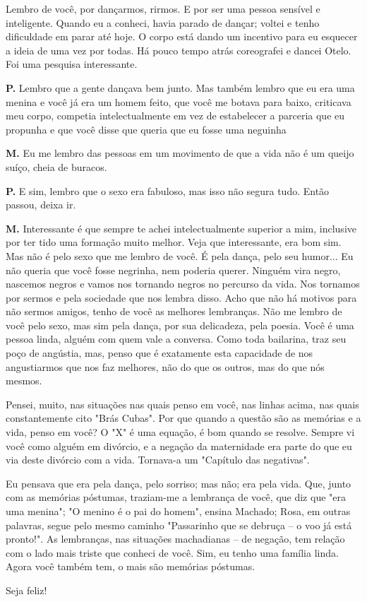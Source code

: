 {Lembro de você, por dançarmos, rirmos. E por ser uma pessoa sensível e
inteligente. Quando eu a conheci, havia parado de dançar; voltei e tenho
dificuldade em parar até hoje. O corpo está dando um incentivo para eu
esquecer a ideia de uma vez por todas. Há pouco tempo atrás coreografei
e dancei Otelo. Foi uma pesquisa interessante.

\textbf{P.} Lembro que a gente dançava bem junto. Mas também lembro que
eu era uma menina e você já era um homem feito, que você me botava para
baixo, criticava meu corpo, competia intelectualmente em vez de
estabelecer a parceria que eu propunha e que você disse que queria que
eu fosse uma neguinha

\textbf{M.} Eu me lembro das pessoas em um movimento de que a vida não é
um queijo suíço, cheia de buracos.

\textbf{P.} E sim, lembro que o sexo era fabuloso, mas isso não segura
tudo. Então passou, deixa ir.

\textbf{M.} Interessante é que sempre te achei intelectualmente superior
a mim, inclusive por ter tido uma formação muito melhor. Veja que
interessante, era bom sim. Mas não é pelo sexo que me lembro de você. É
pela dança, pelo seu humor... Eu não queria que você fosse negrinha, nem
poderia querer. Ninguém vira negro, nascemos negros e vamos nos tornando
negros no percurso da vida. Nos tornamos por sermos e pela sociedade que
nos lembra disso. Acho que não há motivos para não sermos amigos, tenho
de você as melhores lembranças. Não me lembro de você pelo sexo, mas sim
pela dança, por sua delicadeza, pela poesia. Você é uma pessoa linda,
alguém com quem vale a conversa. Como toda bailarina, traz seu poço de
angústia, mas, penso que é exatamente esta capacidade de nos
angustiarmos que nos faz melhores, não do que os outros, mas do que nós
mesmos.

Pensei, muito, nas situações nas quais penso em você, nas linhas acima,
nas quais constantemente cito "Brás Cubas". Por que quando a questão são
as memórias e a vida, penso em você? O "X" é uma equação, é bom quando
se resolve. Sempre vi você como alguém em divórcio, e a negação da
maternidade era parte do que eu via deste divórcio com a vida. Tornava-a
um "Capítulo das negativas".

Eu pensava que era pela dança, pelo sorriso; mas não; era pela vida.
Que, junto com as memórias póstumas, traziam-me a lembrança de você, que
diz que "era uma menina"; "O menino é o pai do homem", ensina Machado;
Rosa, em outras palavras, segue pelo mesmo caminho "Passarinho que se
debruça -- o voo já está pronto!". As lembranças, nas situações
machadianas -- de negação, tem relação com o lado mais triste que conheci
de você. Sim, eu tenho uma família linda. Agora você também tem, o mais
são memórias póstumas.

Seja feliz!
}
